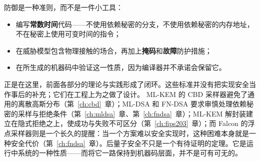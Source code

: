 防御是一种准则，而不是一件小工具：

\begin{itemize}
  \item 编写\textbf{常数时间}代码——不使用依赖秘密的分支，不使用依赖秘密的内存地址，不在秘密上使用可变时间的指令；
  \item 在威胁模型包含物理接触的场合，再加上\textbf{掩码}和\textbf{故障}防护措施；
  \item 在所生成的机器码中验证这一性质，因为编译器并不承诺会保留它。
\end{itemize}

正是在这里，前面各部分的理论与实践形成了闭环。这些标准并没有把实现安全当作事后的补充；它们在工程上为之做了设计。
ML-KEM 的 CBD 采样器避免了通用的离散高斯分布（第~\ref{ch:cbd}~章）；ML-DSA 和 FN-DSA 要求审慎处理依赖秘密的采样与拒绝条件（第~\ref{ch:mldsa}~章、第~\ref{ch:fndsa}~章）；ML-KEM 解封装建立在隐式拒绝之上，使成功与失败不可区分（第~\ref{ch:fips203}~章）；而 Falcon 的浮点采样器则是一个长久的提醒：当一个方案难以安全实现时，这种困难本身就是一种安全代价（第~\ref{ch:fndsa}~章）。后量子安全不只是一个有待证明的定理。它是运行中系统的一种性质——而将它一路保持到机器码层面，并不是可有可无的。

\printbibliography[heading=chapterrefs]
